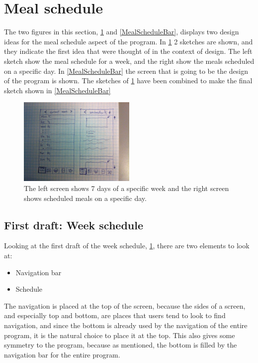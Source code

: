 \section{Meal schedule}

The two figures in this section, \cref{MealScheduleList} and \cref{MealScheduleBar}, displays two design ideas for the meal schedule aspect of the program. In \cref{MealScheduleList} 2 sketches are shown, and they indicate the first idea that were thought of in the context of design. The left sketch show the meal schedule for a week, and the right show the meals scheduled on a specific day. In \cref{MealScheduleBar} the screen that is going to be the design of the program is shown. The sketches of \cref{MealScheduleList} have been combined to make the final sketch shown in \cref{MealScheduleBar}

\begin{figure}[H]
	\centering
    \includegraphics[width=0.5\textwidth]{Grafik/FoodPlanner/FinalMealScheduleSketch1}
	\caption{The left screen shows 7 days of a specific week and the right screen shows scheduled meals on a specific day.}
	\label{MealScheduleList}
\end{figure}

\subsection{First draft: Week schedule}

Looking at the first draft of the week schedule, \cref{MealScheduleList}, there are two elements to look at:

\begin{itemize}
    \item Navigation bar
    \item Schedule
\end{itemize}

The navigation is placed at the top of the screen, because the sides of a screen, and especially top and bottom, are places that users tend to look to find navigation, and since the bottom is already used by the navigation of the entire program, it is the natural choice to place it at the top. This also gives some symmetry to the program, because as mentioned, the bottom is filled by the navigation bar for the entire program.

